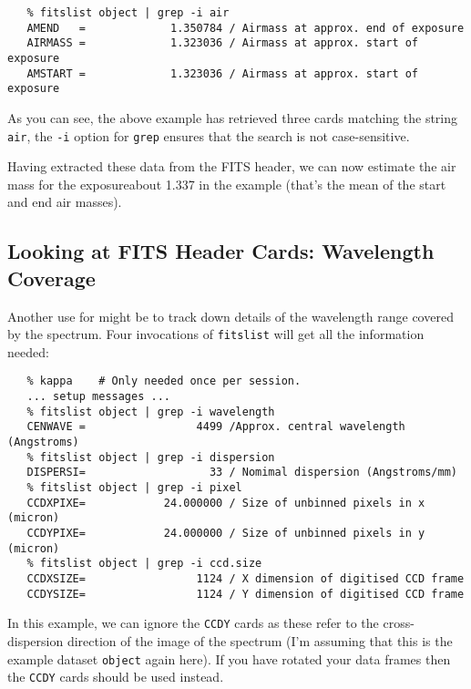 {{{
\scspec{\small}{ }
\begin{verbatim}
   % fitslist object | grep -i air
   AMEND   =             1.350784 / Airmass at approx. end of exposure
   AIRMASS =             1.323036 / Airmass at approx. start of exposure
   AMSTART =             1.323036 / Airmass at approx. start of exposure
\end{verbatim}
}

As you can see, the above example has retrieved three cards matching the
string \verb+air+, the \verb+-i+ option for \verb+grep+ ensures that the
search is not case-sensitive.

Having extracted these data from the FITS header, we can now estimate
the air mass for the exposure\scspec{---}{ - }about 1.337 in the example
(that's the mean of the start and end air masses).


\subsection{Looking at FITS Header Cards:
            Wavelength Coverage}

Another use for  might be to
track down details of the wavelength range covered by the spectrum.
Four invocations of \verb+fitslist+ will get all the information needed:

{
\scspec{\small}{ }
\begin{verbatim}
   % kappa    # Only needed once per session.
   ... setup messages ...
   % fitslist object | grep -i wavelength
   CENWAVE =                 4499 /Approx. central wavelength (Angstroms)
   % fitslist object | grep -i dispersion
   DISPERSI=                   33 / Nomimal dispersion (Angstroms/mm)
   % fitslist object | grep -i pixel
   CCDXPIXE=            24.000000 / Size of unbinned pixels in x (micron)
   CCDYPIXE=            24.000000 / Size of unbinned pixels in y (micron)
   % fitslist object | grep -i ccd.size
   CCDXSIZE=                 1124 / X dimension of digitised CCD frame
   CCDYSIZE=                 1124 / Y dimension of digitised CCD frame
\end{verbatim}
}

In this example, we can ignore the \verb+CCDY+ cards as these refer
to the cross-dispersion direction of the image of the spectrum (I'm
assuming that this is the example dataset \verb+object+ again here).
If you have rotated your data frames then the \verb+CCDY+ cards
should be used instead.

}}
